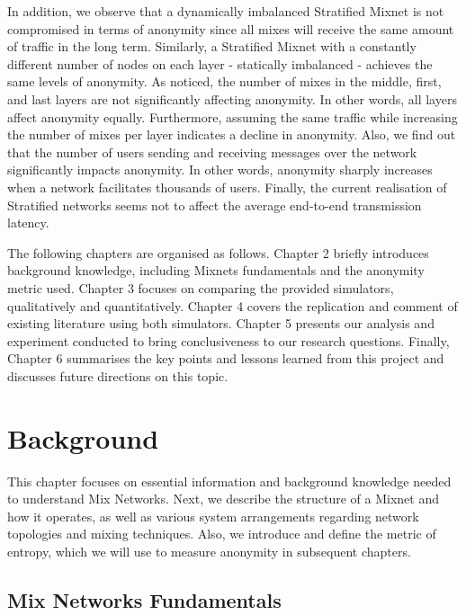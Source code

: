 \documentclass[logo,msc,cyber]{infthesis}   %
\begin{document}
In addition, we observe that a dynamically imbalanced Stratified Mixnet is not
compromised in terms of anonymity since all mixes will receive the same amount
of traffic in the long term. Similarly, a Stratified Mixnet with a constantly
different number of nodes on each layer - statically imbalanced - achieves the
same levels of anonymity. As noticed, the number of mixes in the middle, first,
and last layers are not significantly affecting anonymity. In other words, all
layers affect anonymity equally. Furthermore, assuming the same traffic while
increasing the number of mixes per layer indicates a decline in anonymity. Also,
we find out that the number of users sending and receiving messages over the
network significantly impacts anonymity. In other words, anonymity sharply
increases when a network facilitates thousands of users. Finally, the current
realisation of Stratified networks seems not to affect the average end-to-end
transmission latency.

The following chapters are organised as follows. Chapter 2 briefly introduces
background knowledge, including Mixnets fundamentals and the anonymity metric
used. Chapter 3 focuses on comparing the provided simulators, qualitatively and
quantitatively. Chapter 4 covers the replication and comment of existing
literature using both simulators. Chapter 5 presents our analysis and experiment
conducted to bring conclusiveness to our research questions. Finally, Chapter 6
summarises the key points and lessons learned from this project and discusses
future directions on this topic.


\chapter{Background}
This chapter focuses on essential information and background knowledge needed to
understand Mix Networks. Next, we describe the structure of a Mixnet and how it
operates, as well as various system arrangements regarding network topologies
and mixing techniques. Also, we introduce and define the metric of entropy,
which we will use to measure anonymity in subsequent chapters.

\section{Mix Networks Fundamentals} 
\end{document}
